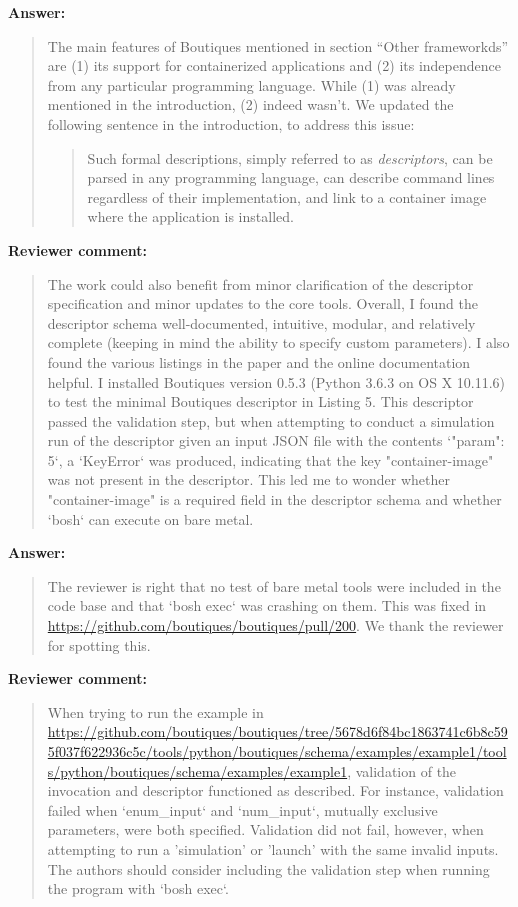 \documentclass[a4]{article}
\newenvironment{review}%
{\textbf{Reviewer comment:}\begin{quote}}%
{\end{quote}}%
\newenvironment{answer}%
{\textbf{Answer:}\begin{small}\begin{quote}}%
{\end{quote}\end{small}}%
\begin{document}
\begin{answer}
The main features of Boutiques mentioned in section ``Other
frameworkds'' are (1) its support for containerized applications and
(2) its independence from any particular programming language. While
(1) was already mentioned in the introduction, (2) indeed wasn't. We
updated the following sentence in the introduction, to address this
issue:

\begin{quote}
  Such formal descriptions, simply referred
to as \emph{descriptors}, \color{blue}can be parsed in any programming language,
can describe command lines regardless of their implementation,\color{black}
and link to a container image where the application is
installed.
\end{quote}

\end{answer}

\begin{review}
The work could also benefit from minor clarification of the descriptor
specification and minor updates to the core tools. Overall, I found
the descriptor schema well-documented, intuitive, modular, and
relatively complete (keeping in mind the ability to specify custom
parameters). I also found the various listings in the paper and the
online documentation helpful. I installed Boutiques version 0.5.3
(Python 3.6.3 on OS X 10.11.6) to test the minimal Boutiques
descriptor in Listing 5. This descriptor passed the validation step,
but when attempting to conduct a simulation run of the descriptor
given an input JSON file with the contents `{"param": 5}`, a
`KeyError` was produced, indicating that the key "container-image" was
not present in the descriptor. This led me to wonder whether
"container-image" is a required field in the descriptor schema and
whether `bosh` can execute on bare metal.
\end{review}

\begin{answer}
  The reviewer is right that no test of bare metal tools were included
  in the code base and that `bosh exec` was crashing on them. This was
  fixed in \url{https://github.com/boutiques/boutiques/pull/200}. We
  thank the reviewer for spotting this.
\end{answer}


\begin{review}
When trying to run the example in
\url{https://github.com/boutiques/boutiques/tree/5678d6f84bc1863741c6b8c595f037f622936c5c/tools/python/boutiques/schema/examples/example1/tools/python/boutiques/schema/examples/example1},
validation of the invocation and descriptor functioned as
described. For instance, validation failed when `enum\_input` and
`num\_input`, mutually exclusive parameters, were both
specified. Validation did not fail, however, when attempting to run a
'simulation' or 'launch' with the same invalid inputs. The authors
should consider including the validation step when running the program
with `bosh exec`.
\end{review}
\end{document}
